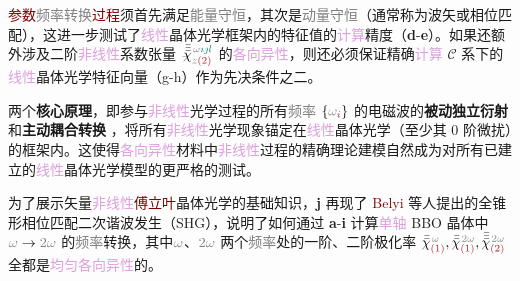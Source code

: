 \textcolor{Maroon}{参数}\textcolor{gray}{频率转换}\textcolor{Maroon}{过程}须首先满足\textcolor{gray}{能量守恒}，其次是\textcolor{gray}{动量守恒}（通常称为\textcolor{PineGreen}{波矢}或\textcolor{PineGreen}{相位匹配}），这进一步测试了\textcolor{Plum}{线性}\textcolor{PineGreen}{晶体光学}框架内的\textcolor{PineGreen}{特征值}的\textcolor{Plum}{计算}精度（\textbf{d}-\textbf{e}）。如果还额外涉及二阶\textcolor{Plum}{非线性}系数张量 $\xint{{}^{}_{\mathcolor{gray}{-}}}{23}{\bar{\bar{\bar{\chi}}}}^{\;\! \mathcolor{gray}{\omega} \textcolor{PineGreen}{\imath \jmath l}}_{\mathcolor{gray}{z} \textcolor{Maroon}{(2)}}$ 的\textcolor{Plum}{各向异性}，则还必须保证精确\textcolor{Plum}{计算} \textcolor{PineGreen}{$\mathcal{C}$ 系}下\cite{midwinterEffectsPhaseMatching1965,yaoAccurateCalculationOptimum1992,dmitrievEffectiveNonlinearityCoefficients1993,diesperovEffectiveNonlinearCoefficient1997}的\textcolor{Plum}{线性}\textcolor{PineGreen}{晶体光学}\textcolor{PineGreen}{特征向量}（g-h）作为先决条件之二。

两个\textbf{核心原理}，即参与\textcolor{Plum}{非线性}\textcolor{NavyBlue}{光学}过程的所有\textcolor{gray}{频率} $\left\{ \mathcolor{gray}{\omega}_{\textcolor{Maroon}{i}} \right\}$ 的电磁波的\textbf{被动独立衍射}   和\textbf{主动耦合转换}  ，将所有\textcolor{Plum}{非线性}\textcolor{NavyBlue}{光学}现象锚定在\textcolor{Plum}{线性}\textcolor{PineGreen}{晶体光学}（至少其 \textcolor{NavyBlue}{0 阶微扰}）的框架内。这使得\textcolor{Plum}{各向异性}材料中\textcolor{Plum}{非线性}过程的精确\textcolor{NavyBlue}{理论建模}自然成为对所有已建立的\textcolor{Plum}{线性}\textcolor{PineGreen}{晶体光学}模型的更严格的测试。

为了展示矢量\textcolor{Plum}{非线性}\textcolor{Maroon}{傅立叶}\textcolor{PineGreen}{晶体光学}的基础知识，\textbf{j} 再现了 \textcolor{Maroon}{Belyi} 等人\cite{belyiPropagationHighorderCircularly2011}提出的\textcolor{PineGreen}{全锥形相位匹配}二次谐波发生（SHG），说明了如何通过 \textbf{a}-\textbf{i} 计算\textcolor{Plum}{单轴} BBO 晶体中 $\mathcolor{gray}{\omega} \to \mathcolor{gray}{2\omega}$ 的\textcolor{gray}{频率}转换，其中$\mathcolor{gray}{\omega}$、$\mathcolor{gray}{2\omega}$ 两个\textcolor{gray}{频率}处的一阶、二阶极化率 $\bar{\bar{\chi}}^{\;\! \mathcolor{gray}{\omega}}_{ \textcolor{Maroon}{(1)}},\bar{\bar{\chi}}^{\;\! \mathcolor{gray}{2\omega}}_{ \textcolor{Maroon}{(1)}},\bar{\bar{\bar{\chi}}}^{\;\! \mathcolor{gray}{2\omega}}_{ \textcolor{Maroon}{(2)}}$ 全都是\textcolor{Plum}{均匀}\textcolor{Plum}{各向异性}的。

